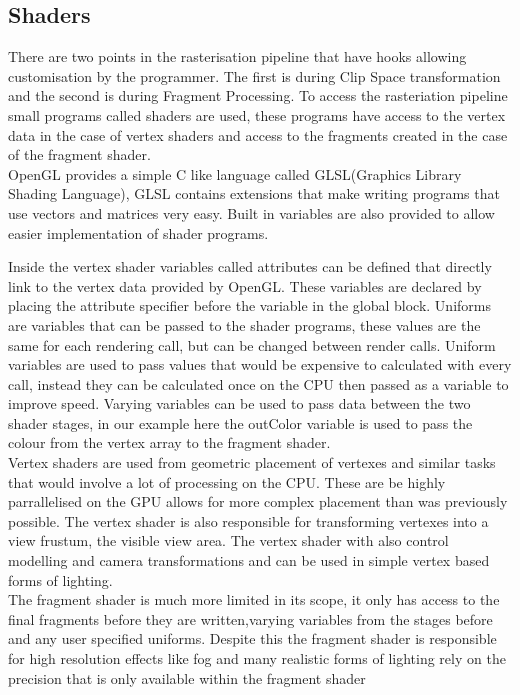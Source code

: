 \subsection{Shaders}
There are two points in the rasterisation pipeline that have hooks allowing
customisation by the programmer. The first is during Clip Space transformation
and the second is during Fragment Processing. To access the rasteriation pipeline
small programs called shaders are used, these programs have access to the
vertex data in the case of vertex shaders and access to the fragments created in
the case of the fragment shader.\\

OpenGL provides a simple C like language called GLSL(Graphics Library Shading 
Language), GLSL contains extensions that make writing programs that use vectors
and matrices very easy. Built in variables are also provided to allow easier
implementation of shader programs. \\



Inside the vertex shader variables called attributes can be defined that directly
link to the vertex data provided by OpenGL. These variables are declared by 
placing the attribute specifier before the variable in the global block.
Uniforms are variables that can be passed to the shader programs, 
these values are the 
same for each rendering call, but can be changed between render calls. Uniform
variables are used to pass values that would be expensive to calculated with every
call, instead they can be calculated once on the CPU then passed as a variable to
improve speed. Varying variables can be used to pass data between the two shader 
stages, in our example here the outColor variable is used to pass the colour from the
vertex array to the fragment shader.\\

Vertex shaders are used from geometric placement of vertexes and similar tasks
that would involve a lot of processing on the CPU. These are be highly 
parrallelised on the GPU allows for more complex placement than was previously
possible. The vertex shader is also responsible for transforming vertexes into
a view frustum, the visible view area. The vertex shader with also control 
modelling and camera transformations and can be used in simple vertex based forms
of lighting.\\

The fragment shader is much more limited in its scope, it only has access to the
final fragments before they are written,varying variables from the stages before and
any user specified uniforms. Despite
this the fragment shader is responsible for high resolution effects like fog and
many realistic forms of lighting rely on the precision that is only available
within the fragment shader\\

